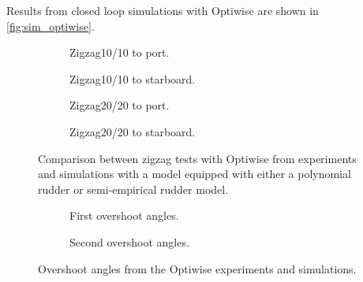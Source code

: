 Results from closed loop simulations with Optiwise are shown in \autoref{fig:sim_optiwise}. 
\begin{figure}[h]
     \centering
     \begin{subfigure}[b]{0.40\textwidth}
         \centering
         
        \caption{Zigzag10/10 to port.}
        \label{fig:sim_optiwise_10_port}
     \end{subfigure}
     \hfill
     \begin{subfigure}[b]{0.40\textwidth}
         
        \caption{Zigzag10/10 to starboard.}
        \label{fig:sim_optiwise_10_stbd}
     \end{subfigure}
     \vfill
     \begin{subfigure}[b]{0.40\textwidth}
         \centering
         
        \caption{Zigzag20/20 to port.}
        \label{fig:sim_optiwise_20_port}
     \end{subfigure}
     \hfill
     \begin{subfigure}[b]{0.40\textwidth}
         
        \caption{Zigzag20/20 to starboard.}
        \label{fig:sim_optiwise_20_stbd}
     \end{subfigure}
     
        \caption{Comparison between zigzag tests with Optiwise from experiments and simulations with a model equipped with either a polynomial rudder or semi-empirical rudder model.}
        \label{fig:sim_optiwise}
\end{figure}

\begin{figure}[h]
     \centering
     \begin{subfigure}[b]{\textwidth}
         \centering
         
        \caption{First overshoot angles.}
        \label{fig:overhoots1_optiwise}
     \end{subfigure}
     \vfill
     \begin{subfigure}[b]{\textwidth}
         \centering
         
        \caption{Second overshoot angles.}
        \label{fig:overhoots2_optiwise}
     \end{subfigure}
     
        \caption{Overshoot angles from the Optiwise experiments and simulations.}
        \label{fig:overshoots_optiwise}
\end{figure}